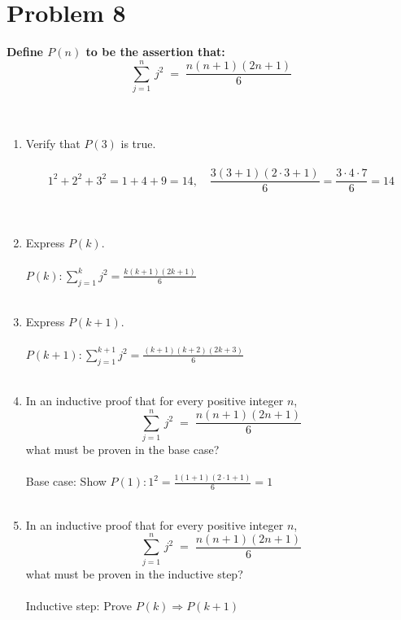 \documentclass{amsart}
\theoremstyle{definition}
\theoremstyle{Exercise}
\theoremstyle{remark}
\theoremstyle{rule}
\numberwithin{equation}{section}
\begin{document}
\section*{Problem 8}
{\bf Define $P(n)$ to be the assertion that:}\\
\[\displaystyle \sum_{j=1}^{n}\, j^2 \;=\;\frac{n(n+1)(2n+1)}{6}\]\\\\
\begin{enumerate}[label=(\alph*)]
  \item Verify that $P(3)$ is true.\\\\
   \[ 1^2 + 2^2 + 3^2 = 1 + 4 + 9 = 14, \quad \frac{3(3+1)(2\cdot3+1)}{6} = \frac{3\cdot4\cdot7}{6} = 14 \]
   \\\\

  \item Express $P(k)$.\\\\
   \( P(k): \sum_{j=1}^k j^2 = \frac{k(k+1)(2k+1)}{6} \)
   \\\\

  \item Express $P(k+1)$.\\\\
   \( P(k+1): \sum_{j=1}^{k+1} j^2 = \frac{(k+1)(k+2)(2k+3)}{6} \)
   \\\\

   \item In an inductive proof that for every positive integer $n$,
   \[\displaystyle \sum_{j=1}^{n}\, j^2 \;=\;\frac{n(n+1)(2n+1)}{6}\]
   what must be proven in the base case?\\\\
    Base case: Show \( P(1): 1^2 = \frac{1(1+1)(2\cdot1+1)}{6} = 1 \)
    \\\\

    \item In an inductive proof that for every positive integer $n$,
   \[\displaystyle \sum_{j=1}^{n}\, j^2 \;=\;\frac{n(n+1)(2n+1)}{6}\]
   what must be proven in the inductive step?\\\\
   Inductive step: Prove \( P(k) \Rightarrow P(k+1) \)
   \\\\


\end{enumerate}
\end{document}
